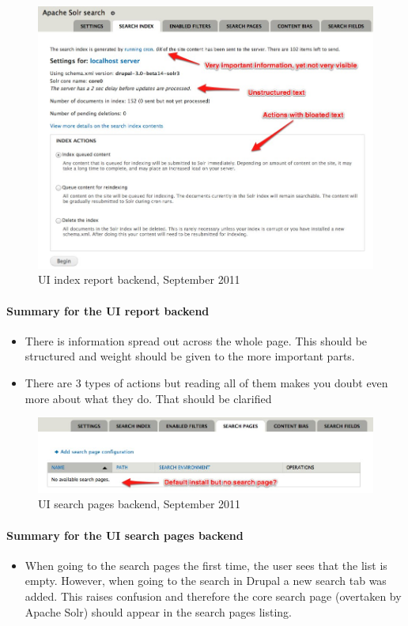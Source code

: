 \begin{figure}[H]
     \includegraphics[width=\textwidth]{images/apachesolr_ui_backend_september_2011_2.jpg}
     \caption{UI index report backend, September 2011}
\end{figure}
\paragraph{Summary for the UI report backend}
\begin{itemize}
\item There is information spread out across the whole page. This should be structured and weight should be given to the more important parts.
\item There are 3 types of actions but reading all of them makes you doubt even more about what they do. That should be clarified
\end{itemize}


\begin{figure}[H]
     \includegraphics[width=\textwidth]{images/apachesolr_ui_backend_september_2011_3.jpg}
     \caption{UI search pages backend, September 2011}
\end{figure}
\paragraph{Summary for the UI search pages backend}
\begin{itemize}
\item When going to the search pages the first time, the user sees that the list is empty. However, when going to the search in Drupal a new search tab was added. This raises confusion and therefore the core search page (overtaken by Apache Solr) should appear in the search pages listing.
\end{itemize}

